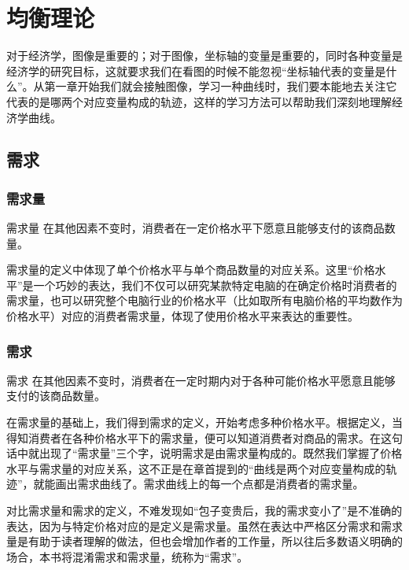 \chapter{均衡理论}
\setlength{\parskip}{0.5\baselineskip}

对于经济学，图像是重要的；对于图像，坐标轴的变量是重要的，同时各种变量是经济学的研究目标，这就要求我们在看图的时候不能忽视“坐标轴代表的变量是什么”。从第一章开始我们就会接触图像，学习一种曲线时，我们要本能地去关注它代表的是哪两个对应变量构成的轨迹，这样的学习方法可以帮助我们深刻地理解经济学曲线。

\section{需求}

\subsection{需求量}

\begin{definition}{需求量}
    在其他因素不变时，消费者在一定价格水平下愿意且能够支付的该商品数量。
\end{definition}

需求量的定义中体现了单个价格水平与单个商品数量的对应关系。这里“价格水平”是一个巧妙的表达，我们不仅可以研究某款特定电脑的在确定价格时消费者的需求量，也可以研究整个电脑行业的价格水平（比如取所有电脑价格的平均数作为价格水平）对应的消费者需求量，体现了使用价格水平来表达的重要性。

\subsection{需求}

\begin{definition}{需求}
    在其他因素不变时，消费者在一定时期内对于各种可能价格水平愿意且能够支付的该商品数量。
\end{definition}

在需求量的基础上，我们得到需求的定义，开始考虑多种价格水平。根据定义，当得知消费者在各种价格水平下的需求量，便可以知道消费者对商品的需求。在这句话中就出现了“需求量”三个字，说明需求是由需求量构成的。既然我们掌握了价格水平与需求量的对应关系，这不正是在章首提到的“曲线是两个对应变量构成的轨迹”，就能画出需求曲线了。需求曲线上的每一个点都是消费者的需求量。

对比需求量和需求的定义，不难发现如“包子变贵后，我的需求变小了”是不准确的表达，因为与特定价格对应的是定义是需求量。虽然在表达中严格区分需求和需求量是有助于读者理解的做法，但也会增加作者的工作量，所以往后多数语义明确的场合，本书将混淆需求和需求量，统称为“需求”。

